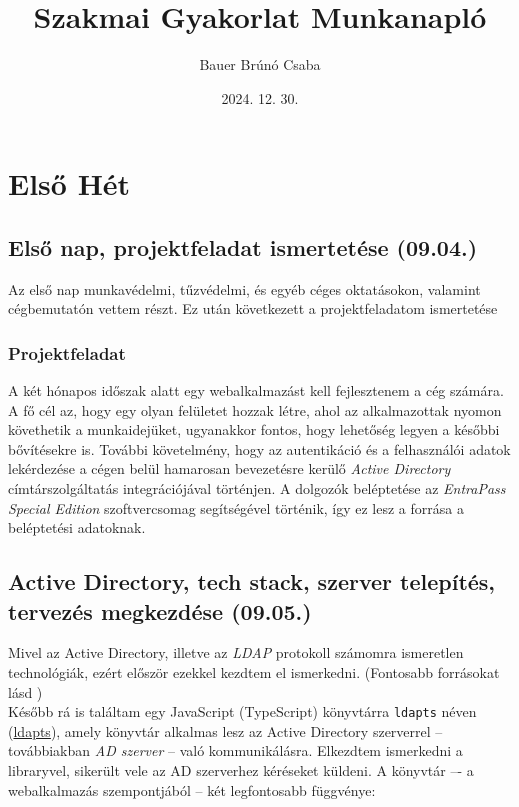 \documentclass[a4paper]{article}
\title{Szakmai Gyakorlat Munkanapló}
\author{Bauer Brúnó Csaba}
\date{2024. 12. 30.}
\newcommand{\inlts}[1]{\texttt{#1}}
\begin{document}
\maketitle

\tableofcontents

\section{Első Hét}

\subsection{Első nap, projektfeladat ismertetése (09.04.)}

Az első nap munkavédelmi, tűzvédelmi, és egyéb céges oktatásokon, valamint cégbemutatón vettem
részt. Ez után következett a projektfeladatom ismertetése

\subsubsection*{Projektfeladat}

A két hónapos időszak alatt egy webalkalmazást kell fejlesztenem a cég számára. A fő cél az, hogy egy
olyan felületet hozzak létre, ahol az alkalmazottak nyomon követhetik a munkaidejüket, ugyanakkor
fontos, hogy lehetőség legyen a későbbi bővítésekre is. További követelmény, hogy az autentikáció és
a felhasználói adatok lekérdezése a cégen belül hamarosan bevezetésre kerülő \emph{Active Directory}
címtárszolgáltatás integrációjával történjen. A dolgozók beléptetése az \emph{EntraPass Special Edition}
szoftvercsomag segítségével történik, így ez lesz a forrása a beléptetési adatoknak.

\subsection{Active Directory, tech stack, szerver telepítés, tervezés megkezdése (09.05.)}

Mivel az Active Directory, illetve az \emph{LDAP} protokoll számomra ismeretlen technológiák, ezért először
ezekkel kezdtem el ismerkedni. (Fontosabb forrásokat lásd \cite{ldapjs, ldapWikipedia})\\

Később rá is találtam egy JavaScript (TypeScript) könyvtárra \inlts{ldapts} néven
(\href{https://github.com/ldapts/ldapts}{ldapts}), amely könyvtár alkalmas lesz az Active Directory szerverrel -- to\-váb\-bi\-ak\-ban \emph{AD szerver} -- való kommunikálásra. Elkezdtem ismerkedni a libraryvel, sikerült vele az
AD szerverhez kéréseket küldeni. A könyvtár –- a webalkalmazás szempontjából -- két legfontosabb
függvénye:
\end{document}
